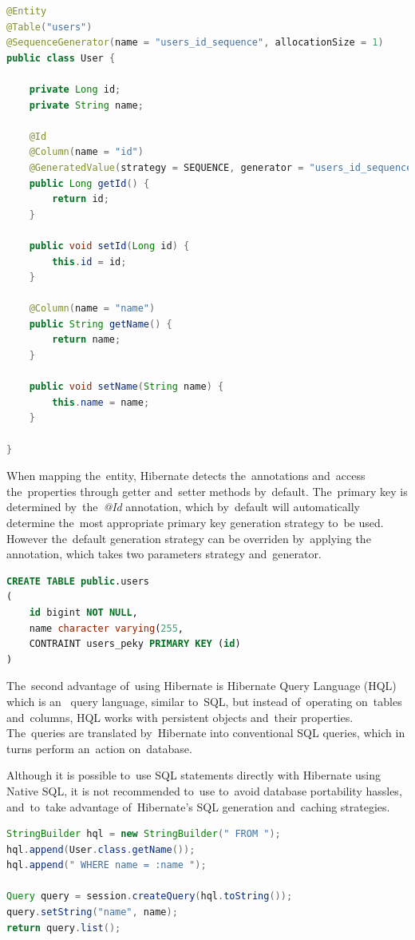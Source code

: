\begin{lstlisting}[caption=POJO class that features the~advantages of~ORM.,
style=dp-default, language=Java, label=lst-table]
@Entity
@Table("users")
@SequenceGenerator(name = "users_id_sequence", allocationSize = 1)
public class User {

	private Long id;
	private String name;
	
	@Id
	@Column(name = "id")
	@GeneratedValue(strategy = SEQUENCE, generator = "users_id_sequence")
	public Long getId() {
		return id;
	}
	
	public void setId(Long id) {
		this.id = id;
	}
	
	@Column(name = "name")
	public String getName() {
		return name;
	}
	
	public void setName(String name) {
		this.name = name;
	}

}
\end{lstlisting}

When mapping the~entity, Hibernate detects the~annotations and~access
the~properties through getter and~setter methods by~default. The~primary key is
determined by~the~\textit{@Id} annotation, which by~default will automatically
determine the~most appropriate primary key generation strategy to~be used.
However the~default generation strategy can be overriden by~applying
the~ annotation, which takes two parameters strategy
and~generator.

\begin{lstlisting}[caption=SQL code that is generated by~Hibernate when mapping
the~class from~the~listing~\ref{lst-hibernate-entity}, style=dp-default,
language=SQL, label=lst-table]
CREATE TABLE public.users
(
	id bigint NOT NULL,
	name character varying(255,
	CONTRAINT users_peky PRIMARY KEY (id)
)
\end{lstlisting}


The~second advantage of~using Hibernate is Hibernate Query Language (HQL) which
is an~ query language, similar to~SQL, but instead
of~operating on~tables and~columns, HQL works with persistent objects and~their
properties. The~queries are translated by~Hibernate into conventional SQL
queries, which in turns perform an~action on~database.

Although it is possible to~use SQL statements directly with Hibernate using
Native SQL, it is not recommended to~use to~avoid database portability hassles,
and~to~take advantage of~Hibernate's SQL generation and~caching strategies.

\begin{lstlisting}[caption=An~example of~HQL query that selects users with~name
\uv{John Doe}., style=dp-default, language=Java, label=lst-hql] 
StringBuilder hql = new StringBuilder(" FROM ");
hql.append(User.class.getName());
hql.append(" WHERE name = :name ");

Query query = session.createQuery(hql.toString());
query.setString("name", name);
return query.list();
\end{lstlisting}

